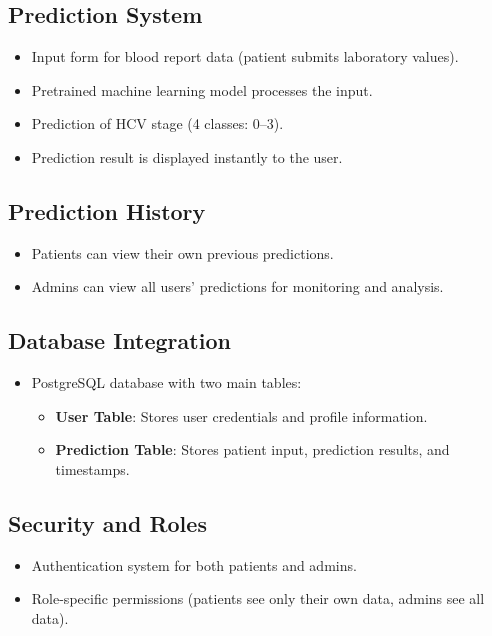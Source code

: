 \subsection*{Prediction System}
\begin{itemize}
    \item Input form for blood report data (patient submits laboratory values).
    \item Pretrained machine learning model processes the input.
    \item Prediction of HCV stage (4 classes: 0--3).
    \item Prediction result is displayed instantly to the user.
\end{itemize}

\subsection*{Prediction History}
\begin{itemize}
    \item Patients can view their own previous predictions.
    \item Admins can view all users' predictions for monitoring and analysis.
\end{itemize}

\subsection*{Database Integration}
\begin{itemize}
    \item PostgreSQL database with two main tables:
    \begin{itemize}
        \item \textbf{User Table}: Stores user credentials and profile information.
        \item \textbf{Prediction Table}: Stores patient input, prediction results, and timestamps.
    \end{itemize}
\end{itemize}

\subsection*{Security and Roles}
\begin{itemize}
    \item Authentication system for both patients and admins.
    \item Role-specific permissions (patients see only their own data, admins see all data).
\end{itemize}

